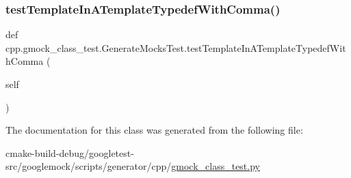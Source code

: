 \subsubsection{\texorpdfstring{testTemplateInATemplateTypedefWithComma()}{testTemplateInATemplateTypedefWithComma()}}
{\footnotesize\ttfamily def cpp.\+gmock\+\_\+class\+\_\+test.\+Generate\+Mocks\+Test.\+test\+Template\+In\+A\+Template\+Typedef\+With\+Comma (\begin{DoxyParamCaption}\item[{}]{self }\end{DoxyParamCaption})}



The documentation for this class was generated from the following file\+:\begin{DoxyCompactItemize}
\item 
cmake-\/build-\/debug/googletest-\/src/googlemock/scripts/generator/cpp/\mbox{\hyperlink{gmock__class__test_8py}{gmock\+\_\+class\+\_\+test.\+py}}\end{DoxyCompactItemize}
